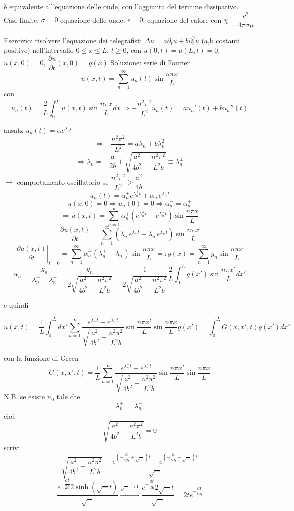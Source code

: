 \documentclass[a4paper,11pt]{report}
\begin{document}
è equivalente all'equazione delle onde, con l'aggiunta del termine dissipativo.\\
Casi limite: $\sigma=0$ equazione delle onde. $\epsilon=0$: equazione del calore con $\chi=\dfrac{c^2}{4\pi \sigma \mu}$

Esercizio: risolvere l'equazione dei telegrafisti $\Delta u = a\partial_t u + b \partial^2_t u$ (a,b costanti positive) nell'intervallo $0\leq x\leq L$, $t\geq 0$, con $u(0,t)=u(L,t)=0$, $u(x,0)=0$, $\dfrac{\partial u}{\partial t}(x,0) = g(x)$
Soluzione: serie di Fourier
$$
u(x,t)=\sum_{n=1}^\infty u_n(t) \sin \dfrac{n\pi x}{L}
$$
con 
$$
u_n(t)=\dfrac{2}{L}\int_0^Lu(x,t)\sin \dfrac{n\pi x}{L}dx \Rightarrow -\dfrac{n^2\pi^2}{L^2}u_n(t)=au_n'(t) + b u_n''(t)
$$

ansatz $u_n(t)=\alpha e^{\lambda_n t}$
$$
\Rightarrow -\dfrac{n^2\pi^2}{L^2}=a\lambda_n + b \lambda_n^2
$$
$$
\Rightarrow \lambda_n = -\dfrac{a}{2b} \pm \sqrt{\dfrac{a^2}{4b^2}-\dfrac{n^2\pi^2}{L^2 b}}\equiv \lambda_n^\pm
$$
$\rightarrow$ comportamento oscillatorio se $\dfrac{n^2\pi^2}{L^2}>\dfrac{a^2}{4b}$
$$
u_n(t)=\alpha_n^+ e^{\lambda_n^+ t} + \alpha_n^-e^{\lambda_n^- t}
$$
$$
u(x,0)=0 \Rightarrow u_n(0)=0 \Rightarrow \alpha_n^- = \alpha_n^+
$$
$$
\Rightarrow u(x,t)=\sum_{n=1}^\infty\alpha_n^+(e^{\lambda_n^+ t}-e^{\lambda_n^- t})\sin\dfrac{n\pi x}{L}
$$
$$
\dfrac{\partial u(x,t)}{\partial t} =\sum_{n=1}^\infty \left(\lambda_n^+ e^{\lambda_n^+ t}-\lambda_n^-e^{\lambda_n^- t}  \right)\sin \dfrac{n\pi x}{L}
$$
$$
\left.\dfrac{\partial u(x,t)}{\partial t}\right|_{t=0}= \sum_{n=1}^\infty \alpha_n^+(\lambda_n^+ - \lambda_n^-)\sin\dfrac{n\pi x}{L} =: g(x) = \sum_{n=1}^\infty g_n \sin \dfrac{n\pi x}{L}
$$
$$
\alpha_n^+ = \dfrac{g_n}{\lambda_n^+ - \lambda_n^-}=\dfrac{g_n}{2\sqrt{\dfrac{a^2}{4b^2}-\dfrac{n^2\pi^2}{L^2 b}}}=\dfrac{1}{2\sqrt{\dfrac{a^2}{4b^2}-\dfrac{n^2\pi^2}{L^2 b}}} \dfrac{2}{L}\int_{0}
^{L}g(x')\sin\dfrac{n\pi x'}{L} dx'
$$

e quindi

$$
u(x,t)=\dfrac{1}{L}\int_0^L dx' \sum_{n=1}^\infty \dfrac{e^{\lambda_n^+ t} - e^{\lambda_n^- t}}{\sqrt{\dfrac{a^2}{4b^2}-\dfrac{n^2\pi^2}{L^2 b}}}\sin\dfrac{n\pi x'}{L}\sin \dfrac{n\pi x}{L}g(x')=\int_0^L G(x,x',t)g(x')dx'
$$

con la funzione di Green
$$
G(x,x',t)=\dfrac{1}{L} \sum_{n=1}^\infty \dfrac{e^{\lambda_n^+ t} - e^{\lambda_n^- t}}{\sqrt{\dfrac{a^2}{4b^2}-\dfrac{n^2\pi^2}{L^2 b}}}\sin\dfrac{n\pi x'}{L}\sin \dfrac{n\pi x}{L}
$$
N.B. se esiste $n_0$ tale che
$$
\lambda_{n_0}^+ = \lambda_{n_0}^-
$$
cioè 
$$
\sqrt{\dfrac{a^2}{4b^2}-\dfrac{n^2\pi^2}{L^2 b}}=0
$$
scrivi
$$
\sqrt{\dfrac{a^2}{4b^2}-\dfrac{n^2\pi^2}{L^2 b}}= \dfrac{e^{\left(-\dfrac{a}{2b}+\sqrt{\cdots}\right)t}- e^{\left(-\dfrac{a}{2b}-\sqrt{\cdots}\right)t}}{\sqrt{\cdots}}
$$
$$
\dfrac{e^{-\dfrac{at}{2b}} 2\sinh (\sqrt{\cdots} t)}{\sqrt{\cdots}}\xrightarrow{\sqrt{\cdots}\to 0} \dfrac{e^{-\dfrac{at}{2b}}2\sqrt{\cdots}t}{\sqrt{\cdots}}=2te^{-\dfrac{at}{2b}}
$$
\end{document}
